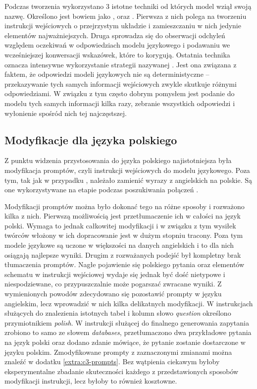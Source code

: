 Podczas tworzenia  wykorzystano 3 istotne techniki od których model wziął swoją nazwę. Określono jest bowiem jako ,  oraz . Pierwsza z nich polega na tworzeniu instrukcji wejściowych o przejrzystym układzie i zamieszczaniu w nich jedynie elementów najważniejszych. Druga sprowadza się do obserwacji odchyleń względem oczekiwań w odpowiedziach modelu językowego i podawaniu we wcześniejszej konwersacji wskazówek, które to korygują. Ostatnia technika oznacza intensywne wykorzystanie strategii nazywanej  . Jest ona związana z faktem, że odpowiedzi modeli językowych nie są deterministyczne -- przekazywanie tych samych informacji wejściowych zwykle skutkuje różnymi odpowiedziami. W związku z tym często dobrym pomysłem jest podanie do modelu tych samych informacji kilka razy, zebranie wszystkich odpowiedzi i wyłonienie spośród nich tej najczęstszej.

\subsection{Modyfikacje dla języka polskiego}
Z punktu widzenia przystosowania  do języka polskiego najistotniejsza była modyfikacja promptów, czyli instrukcji wejściowych do modelu językowego. Poza tym, tak jak w przypadku , należało zamienić wyrazy  z angielskich na polskie. Są one wykorzystywane na etapie  podczas poszukiwania połączeń .

Modyfikacji promptów można było dokonać tego na różne sposoby i rozważono kilka z nich. Pierwszą możliwością jest przetłumaczenie ich w całości na język polski. Wymaga to jednak całkowitej modyfikacji i w związku z tym wysiłek twórców  włożony w ich dopracowanie jest w dużym stopniu tracony. Poza tym modele językowe są uczone w większości na danych angielskich i to dla nich osiągają najlepsze wyniki. Drugim z rozważanych podejść był kompletny brak tłumaczenia promptów. Nagłe pojawienie się polskiego pytania oraz elementów schematu w instrukcji wejściowej wydaje się jednak być dość nietypowe i niespodziewane, co przypuszczalnie może pogarszać zwracane wyniki. Z wymienionych powodów zdecydowano się pozostawić prompty w języku angielskim, lecz wprowadzić w nich kilka delikatnych modyfikacji. W instrukcjach służących do znalezienia istotnych tabel i kolumn słowo \textit{question} określono przymiotnikiem \textit{polish}. W instrukcji służącej do finalnego generowania zapytania zrobiono to samo ze słowem \textit{databases}, przetłumaczono dwa przykładowe pytania na język polski oraz dodano zdanie mówiące, że pytanie zostanie dostarczone w języku polskim. Zmodyfikowane prompty z zaznaczonymi zmianami można znaleźć w dodatku \ref{extra:c3-prompts}. Bez wątpienia ciekawym byłoby eksperymentalne zbadanie skuteczności każdego z przedstawionych sposobów modyfikacji instrukcji, lecz byłoby to również kosztowne.

